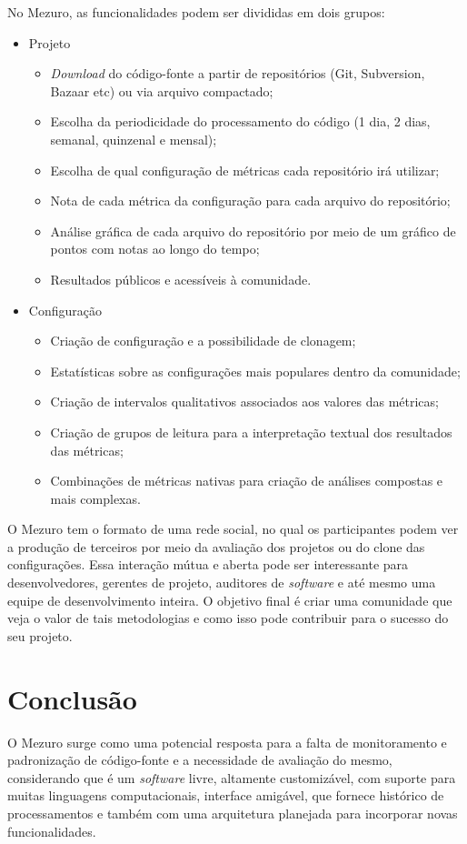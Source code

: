 \documentclass{llncs}
\begin{document}
No Mezuro, as funcionalidades podem ser divididas em dois grupos:

\begin{itemize}
  \item Projeto
    \begin{itemize}
    \item \textit{Download} do código-fonte a partir de repositórios (Git, Subversion, Bazaar etc) ou via arquivo compactado;
        \item Escolha da periodicidade do processamento do código (1 dia, 2 dias, semanal, quinzenal e mensal);
        \item Escolha de qual configuração de métricas cada repositório irá utilizar;
        \item Nota de cada métrica da configuração para cada arquivo do repositório;
        \item Análise gráfica de cada arquivo do repositório por meio de um gráfico de pontos com notas ao longo do tempo;
        \item Resultados públicos e acessíveis à comunidade.
    \end{itemize}
    \item Configuração
    \begin{itemize}
    \item Criação de configuração e a possibilidade de clonagem;
        \item Estatísticas sobre as configurações mais populares dentro da comunidade;
        \item Criação de intervalos qualitativos associados aos valores das métricas;
        \item Criação de grupos de leitura para a interpretação textual dos resultados das métricas;
        \item Combinações de métricas nativas para criação de análises compostas e mais complexas.
    \end{itemize}
\end{itemize}

O Mezuro tem o formato de uma rede social, no qual os participantes podem ver a
produção de terceiros por meio da avaliação dos projetos ou do clone das
configurações. Essa interação mútua e aberta pode ser interessante para
desenvolvedores, gerentes de projeto, auditores de \textit{software} e até
mesmo uma equipe de desenvolvimento inteira. O objetivo final é criar uma
comunidade que veja o valor de tais metodologias e como isso pode contribuir
para o sucesso do seu projeto.

\section{Conclusão}

O Mezuro surge como uma potencial resposta para a falta de monitoramento e
padronização de código-fonte e a necessidade de avaliação do mesmo,
considerando que é um \textit{software} livre, altamente customizável, com
suporte para muitas linguagens computacionais, interface amigável, que fornece
histórico de processamentos e também com uma arquitetura planejada para
incorporar novas funcionalidades.



\end{document}
